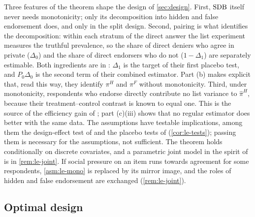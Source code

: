 Three features of the theorem shape the design of \cref{sec:design}. First, $\mathrm{SDB}$ itself never needs monotonicity; only its decomposition into hidden and false endorsement does, and only in the split design. Second, pairing is what identifies the decomposition: within each stratum of the direct answer the list experiment measures the truthful prevalence, so the share of direct deniers who agree in private ($\Delta_0$) and the share of direct endorsers who do not ($1-\Delta_1$) are separately estimable. Both ingredients are in \citet{aronow2015}: $\Delta_1$ is the target of their first placebo test, and $P_0\Delta_0$ is the second term of their combined estimator. Part (b) makes explicit that, read this way, they identify $\pi^H$ and $\pi^F$ without monotonicity. Third, under monotonicity, respondents who endorse directly contribute no list variance to $\widehat\pi^H$, because their treatment--control contrast is known to equal one. This is the source of the efficiency gain of \citet{aronow2015}; part (c)(iii) shows that no regular estimator does better with the same data. The assumptions have testable implications, among them the design-effect test of \citet{blair2012} and the placebo tests of \citet{aronow2015} (\cref{cor:le-tests}); passing them is necessary for the assumptions, not sufficient. The theorem holds conditionally on discrete covariates, and a parametric joint model in the spirit of \citet{imai2011} is in \cref{rem:le-joint}. If social pressure on an item runs towards agreement for some respondents, \cref{asm:le-mono} is replaced by its mirror image, and the roles of hidden and false endorsement are exchanged (\cref{rem:le-joint}).


\subsection{Optimal design}\label{sec:sens-design}


